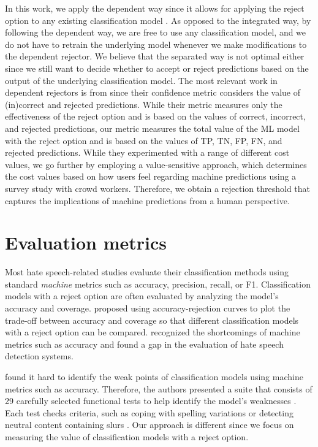 In this work, we apply the dependent way since it allows for applying the reject option to any existing classification model \citep{hendrickx2021machine}.
%
As opposed to the integrated way, by following the dependent way, we are free to use any classification model, and we do not have to retrain the underlying model whenever we make modifications to the dependent rejector.
%
We believe that the separated way is not optimal either since we still want to decide whether to accept or reject predictions based on the output of the underlying classification model.
%
The most relevant work in dependent rejectors is from \citet{de2000reject} since their confidence metric considers the value of (in)correct and rejected predictions.
%
While their metric measures only the effectiveness of the reject option and is based on the values of correct, incorrect, and rejected predictions, our metric measures the total value of the ML model with the reject option and is based on the values of TP, TN, FP, FN, and rejected predictions.
%
While they experimented with a range of different cost values, we go further by employing a value-sensitive approach, which determines the cost values based on how users feel regarding machine predictions using a survey study with crowd workers.
%
Therefore, we obtain a rejection threshold that captures the implications of machine predictions from a human perspective.

\section{Evaluation metrics}
\label{sec:related-work-evaluation-metrics}
Most hate speech-related studies evaluate their classification methods using standard \textit{machine} metrics such as accuracy, precision, recall, or F1.
% 
Classification models with a reject option are often evaluated by analyzing the model's accuracy and coverage.
%
\citet{nadeem2009reject} proposed using accuracy-rejection curves to plot the trade-off between accuracy and coverage so that different classification models with a reject option can be compared.
%
\citet{rottger2020hatecheck, casati2021value, olteanu2017limits} recognized the shortcomings of machine metrics such as accuracy and found a gap in the evaluation of hate speech detection systems.
%

%
\citet{rottger2020hatecheck} found it hard to identify the weak points of classification models using machine metrics such as accuracy.
%
Therefore, the authors presented a suite that consists of 29 carefully selected functional tests to help identify the model's weaknesses \citep{rottger2020hatecheck}.
%
Each test checks criteria, such as coping with spelling variations or detecting neutral content containing slurs \citep{rottger2020hatecheck}.
%
Our approach is different since we focus on measuring the value of classification models with a reject option.
%

